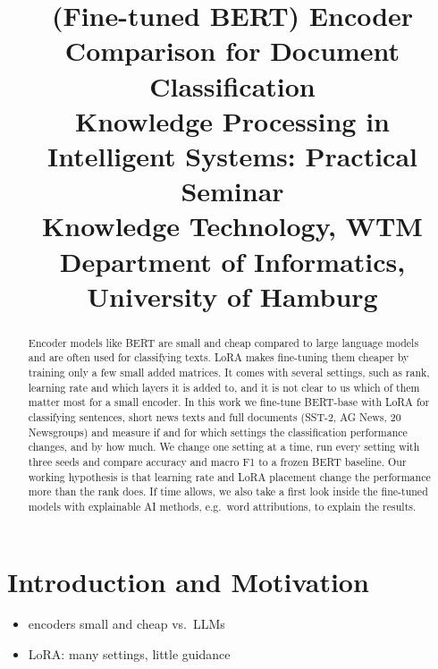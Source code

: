 \documentclass[conference]{IEEEtran}  %
\newcommand{\trtitle}{(Fine-tuned BERT) Encoder Comparison for Document Classification}
\newcommand{\titleshort}{KPIS EC4DC} %
\newcommand{\authorlastnames}{Ebert, Hamza} %
\newcommand{\trcourse}{Knowledge Processing in Intelligent Systems: Practical Seminar}
\newcommand{\trgroup}{Knowledge Technology, WTM}
\newcommand{\truniversity}{Department of Informatics, University of Hamburg}
\theoremstyle{plain}
\theoremstyle{definition}
\theoremstyle{remark}
\begin{document}
\title{\trtitle\\[1.5ex]
\large \trcourse\\[0.5ex]
\trgroup\\[0.5ex]
\truniversity}

\renewcommand{\headheight}{14.5pt}
\fancyhead[LO]{\slshape \authorlastnames}
\fancyhead[RO]{ \slshape \titleshort}

\author{
\and
{}
}

\maketitle


\begin{abstract}
Encoder models like BERT are small and cheap compared to large language models and are often used for classifying texts.
LoRA makes fine-tuning them cheaper by training only a few small added matrices.
It comes with several settings, such as rank, learning rate and which layers it is added to, and it is not clear to us which of them matter most for a small encoder.
In this work we fine-tune BERT-base with LoRA for classifying sentences, short news texts and full documents (SST-2, AG News, 20 Newsgroups) and measure if and for which settings the classification performance changes, and by how much.
We change one setting at a time, run every setting with three seeds and compare accuracy and macro F1 to a frozen BERT baseline.
Our working hypothesis is that learning rate and LoRA placement change the performance more than the rank does.
If time allows, we also take a first look inside the fine-tuned models with explainable AI methods, e.g.\ word attributions, to explain the results.
\end{abstract}

\IEEEpeerreviewmaketitle

\section{Introduction and Motivation}
\label{sec:introduction}
\begin{itemize}
  \item encoders small and cheap vs.\ LLMs
  \item LoRA: many settings, little guidance
\end{itemize}
\end{document}
